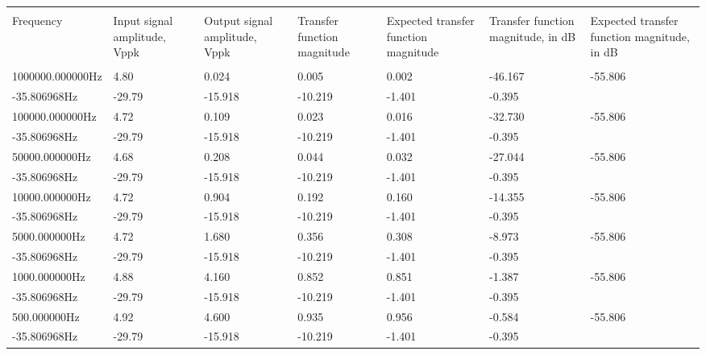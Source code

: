 \begin{table}[!h]\\\begin{center}\\\begin{tabular}{|p{2cm}|p{2cm}|p{2cm}|p{2cm}|p{2cm}|p{2cm}|p{2cm}|}\\\hline\\Frequency & Input signal amplitude, Vppk & Output signal amplitude, Vppk & Transfer function magnitude & Expected transfer function magnitude & Transfer function magnitude, in dB & Expected transfer function magnitude, in dB \\\hline\\1000000.000000Hz	&	4.80	&	0.024	&	0.005	&	0.002	&	-46.167	&	-55.806	&	\\-35.806968Hz	&	-29.79	&	-15.918	&	-10.219	&	-1.401	&	-0.395	&	\hline\\100000.000000Hz	&	4.72	&	0.109	&	0.023	&	0.016	&	-32.730	&	-55.806	&	\\-35.806968Hz	&	-29.79	&	-15.918	&	-10.219	&	-1.401	&	-0.395	&	\hline\\50000.000000Hz	&	4.68	&	0.208	&	0.044	&	0.032	&	-27.044	&	-55.806	&	\\-35.806968Hz	&	-29.79	&	-15.918	&	-10.219	&	-1.401	&	-0.395	&	\hline\\10000.000000Hz	&	4.72	&	0.904	&	0.192	&	0.160	&	-14.355	&	-55.806	&	\\-35.806968Hz	&	-29.79	&	-15.918	&	-10.219	&	-1.401	&	-0.395	&	\hline\\5000.000000Hz	&	4.72	&	1.680	&	0.356	&	0.308	&	-8.973	&	-55.806	&	\\-35.806968Hz	&	-29.79	&	-15.918	&	-10.219	&	-1.401	&	-0.395	&	\hline\\1000.000000Hz	&	4.88	&	4.160	&	0.852	&	0.851	&	-1.387	&	-55.806	&	\\-35.806968Hz	&	-29.79	&	-15.918	&	-10.219	&	-1.401	&	-0.395	&	\hline\\500.000000Hz	&	4.92	&	4.600	&	0.935	&	0.956	&	-0.584	&	-55.806	&	\\-35.806968Hz	&	-29.79	&	-15.918	&	-10.219	&	-1.401	&	-0.395	&	\hline\\\end{tabular}\\\label{tab-low}\\\end{center}\\\end{table}\\